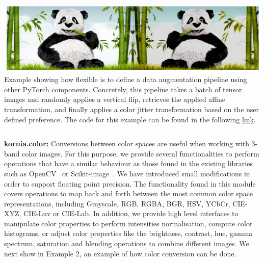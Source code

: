 
%

\begin{tcolorbox}[every float=\centering, drop shadow, title=Example 1: Data augmentation pipeline, label={fig:examples:augmentation}]
    \includegraphics[width=1.\linewidth]{main/chapter03/data/examples/panda_augmentation.jpg}
    {Example showing how flexible is \lib{} to define a data augmentation pipeline using other PyTorch components. Concretely, this pipeline takes a batch of tensor images and randomly applies a vertical flip, retrieves the applied affine transformation, and finally applies a color jitter transformation based on the user defined preference. The code for this example can be found in the following \underline{\color{blue}\href{https://colab.research.google.com/drive/1iWUVw5jRBiUm0X48cROZO8yWCWN27sbG}{link}}.}
    \inputminted[python3, baselinestretch=1., style=vs, fontfamily=courier, fontsize=\footnotesize, funcnamehighlighting=true,firstline=1,lastline=19]{python}{main/chapter03/data/examples/snipet_augmentation.py}
\end{tcolorbox}

\newpage

\noindent\textbf{kornia.color:} Conversions between color spaces are useful when working with 3-band color images. For this purpose,  we provide several functionalities to perform operations that have a similar behaviour as those found in the existing libraries such as OpenCV~\citep{opencv} or Scikit-image~\citep{scikit-image}. We have introduced  small modifications in order to support floating point precision. The functionality found in this module covers operations to map back and forth between the most common color space representations, including Grayscale, RGB, RGBA, BGR, HSV, YCbCr, CIE-XYZ, CIE-Luv or CIE-Lab. In addition, we provide high level interfaces to manipulate color properties  to perform intensities normalisation, compute color histograms, or  adjust color properties like  the brightness, contrast, hue, gamma spectrum, saturation and blending operations to combine different images. We next show in Example 2, an example of how color conversion can be done.

